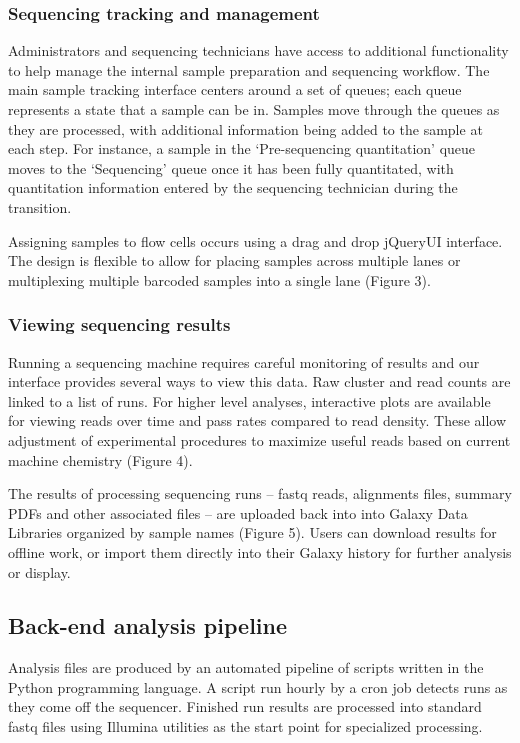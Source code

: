 \documentclass[10pt]{bmc_article}
\newenvironment{bmcformat}{\begin{raggedright}\baselineskip20pt\sloppy\setboolean{publ}{false}}{\end{raggedright}\baselineskip20pt\sloppy}
\begin{document}
\begin{bmcformat}
\subsubsection*{Sequencing tracking and management}

Administrators and sequencing technicians have access to additional
functionality to help manage the internal sample preparation and
sequencing workflow. The main sample tracking interface centers around
a set of queues; each queue represents a state that a sample can be
in. Samples move through the queues as they are processed, with
additional information being added to the sample at each step. For
instance, a sample in the ‘Pre-sequencing quantitation’ queue moves to
the ‘Sequencing’ queue once it has been fully quantitated, with
quantitation information entered by the sequencing technician during
the transition.

Assigning samples to flow cells occurs using a drag and drop jQueryUI
interface. The design is flexible to allow for placing samples across
multiple lanes or multiplexing multiple barcoded samples into a single
lane (Figure 3).

\subsubsection*{Viewing sequencing results}

Running a sequencing machine requires careful monitoring of results
and our interface provides several ways to view this data. Raw cluster
and read counts are linked to a list of runs. For higher level
analyses, interactive plots are available for viewing reads over time
and pass rates compared to read density. These allow adjustment of
experimental procedures to maximize useful reads based on current
machine chemistry (Figure 4).

The results of processing sequencing runs -- fastq reads, alignments
files, summary PDFs and other associated files -- are uploaded back
into into Galaxy Data Libraries organized by sample names (Figure
5). Users can download results for offline work, or import them
directly into their Galaxy history for further analysis or display.

\subsection*{Back-end analysis pipeline}

Analysis files are produced by an automated pipeline of scripts
written in the Python programming language. A script run hourly by a
cron job detects runs as they come off the sequencer. Finished run
results are processed into standard fastq files using Illumina
utilities as the start point for specialized processing.


\end{bmcformat}
\end{document}
